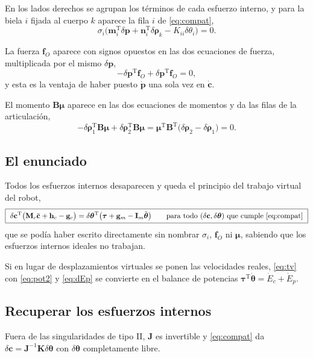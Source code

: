 \documentclass[11pt]{article}
\newcommand{\T}{^{\mathrm{T}}}
\newcommand{\pvec}{\mathbf{p}}
\newcommand{\muv}{\boldsymbol{\mu}}
\newcommand{\cd}{\dot{\mathbf{c}}}
\newcommand{\cdd}{\ddot{\mathbf{c}}}
\newcommand{\dth}{\delta\boldsymbol{\rho}}
\newcommand{\thv}{\boldsymbol{\theta}}
\newcommand{\tauv}{\boldsymbol{\tau}}
\begin{document}
En los lados derechos se agrupan los términos de cada esfuerzo interno, y para la biela $i$ fijada al cuerpo $k$ aparece la fila $i$ de \eqref{eq:compat},
\begin{equation}
\sigma_i\big(\mathbf{m}_i\T\delta\pvec+\mathbf{n}_i\T\dth_k-K_{ii}\delta\theta_i\big)=0 .
\label{eq:biela}
\end{equation}

La fuerza $\mathbf{f}_O$ aparece con signos opuestos en las dos ecuaciones de fuerza, multiplicada por el mismo $\delta\pvec$,
\begin{equation}
-\delta\pvec\T\mathbf{f}_O+\delta\pvec\T\mathbf{f}_O=0 ,
\label{eq:fO}
\end{equation}
y esta es la ventaja de haber puesto $\dot{\pvec}$ una sola vez en $\cd$.

El momento $\mathbf{B}\muv$ aparece en las dos ecuaciones de momentos y da las filas de la articulación,
\begin{equation}
-\dth_1\T\mathbf{B}\muv+\dth_2\T\mathbf{B}\muv=\muv\T\mathbf{B}\T\big(\dth_2-\dth_1\big)=0 .
\label{eq:mO}
\end{equation}

\subsection{El enunciado}

Todos los esfuerzos internos desaparecen y queda el principio del trabajo virtual del robot,
\begin{equation}
\boxed{\ \delta\mathbf{c}\T\big(\mathbf{M}_c\cdd+\mathbf{h}_c-\mathbf{g}_c\big)
=\delta\thv\T\big(\tauv+\mathbf{g}_m-\mathbf{I}_m\ddot{\thv}\big)
\qquad\text{para todo }(\delta\mathbf{c},\delta\thv)\text{ que cumple \eqref{eq:compat}}\ }
\label{eq:tv}
\end{equation}
que se podía haber escrito directamente sin nombrar $\sigma_i$, $\mathbf{f}_O$ ni $\muv$, sabiendo que los esfuerzos internos ideales no trabajan.

Si en lugar de desplazamientos virtuales se ponen las velocidades reales, \eqref{eq:tv} con \eqref{eq:pot2} y \eqref{eq:dEp} se convierte en el balance de potencias $\tauv\T\dot{\thv}=\dot E_c+\dot E_p$.

\subsection{Recuperar los esfuerzos internos}

Fuera de las singularidades de tipo II, $\mathbf{J}$ es invertible y \eqref{eq:compat} da $\delta\mathbf{c}=\mathbf{J}^{-1}\mathbf{K}\delta\thv$ con $\delta\thv$ completamente libre.
\end{document}
